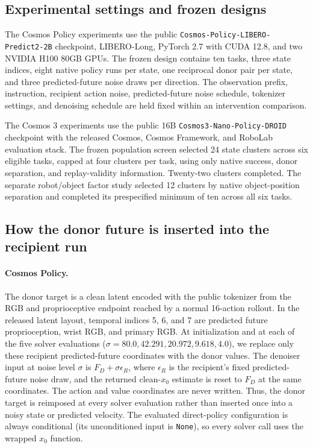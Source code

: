 \documentclass{article}
\begin{document}
\subsection{Experimental settings and frozen designs}
\label{app:settings}

The Cosmos Policy experiments use the public \texttt{Cosmos-Policy-LIBERO-Predict2-2B} checkpoint, LIBERO-Long, PyTorch 2.7 with CUDA 12.8, and two NVIDIA H100 80GB GPUs. The frozen design contains ten tasks, three state indices, eight native policy runs per state, one reciprocal donor pair per state, and three predicted-future noise draws per direction. The observation prefix, instruction, recipient action noise, predicted-future noise schedule, tokenizer settings, and denoising schedule are held fixed within an intervention comparison.

The Cosmos 3 experiments use the public 16B \texttt{Cosmos3-Nano-Policy-DROID} checkpoint with the released Cosmos, Cosmos Framework, and RoboLab evaluation stack. The frozen population screen selected 24 state clusters across six eligible tasks, capped at four clusters per task, using only native success, donor separation, and replay-validity information. Twenty-two clusters completed. The separate robot/object factor study selected 12 clusters by native object-position separation and completed its prespecified minimum of ten across all six tasks.

\subsection{How the donor future is inserted into the recipient run}
\label{app:future_replacement_impl}

\paragraph{Cosmos Policy.}
The donor target is a clean latent encoded with the public tokenizer from the RGB and proprioceptive endpoint reached by a normal 16-action rollout. In the released latent layout, temporal indices 5, 6, and 7 are predicted future proprioception, wrist RGB, and primary RGB. At initialization and at each of the five solver evaluations ($\sigma=80.0,42.291,20.972,9.618,4.0$), we replace only these recipient predicted-future coordinates with the donor values. The denoiser input at noise level $\sigma$ is $F_D+\sigma\epsilon_R$, where $\epsilon_R$ is the recipient's fixed predicted-future noise draw, and the returned clean-$x_0$ estimate is reset to $F_D$ at the same coordinates. The action and value coordinates are never written. Thus, the donor target is reimposed at every solver evaluation rather than inserted once into a noisy state or predicted velocity. The evaluated direct-policy configuration is always conditional (its unconditioned input is \texttt{None}), so every solver call uses the wrapped $x_0$ function.
\end{document}
